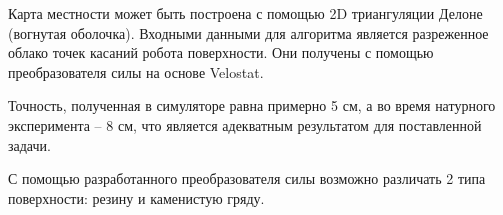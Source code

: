 Карта местности может быть построена с помощью 2D триангуляции Делоне (вогнутая оболочка). Входными данными для алгоритма является разреженное облако точек касаний робота поверхности. Они получены с помощью преобразователя силы на основе Velostat.

Точность, полученная в симуляторе равна примерно 5 см, а во время натурного эксперимента -- 8 см, что является адекватным результатом для поставленной задачи.

С помощью разработанного преобразователя силы возможно различать 2 типа поверхности: резину и каменистую гряду.